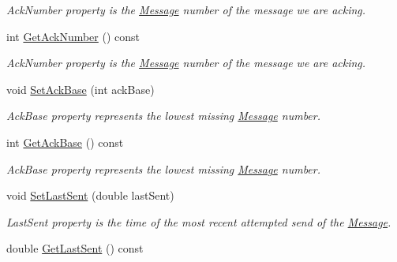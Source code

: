 \begin{DoxyCompactItemize}
\begin{DoxyCompactList}\small\item\em AckNumber property is the \hyperlink{classPseudoTcp_1_1Message}{Message} number of the message we are acking. \item\end{DoxyCompactList}\item 
\hypertarget{group__group1_ga5cb28e660d6cbed4a7bffbe6c2597cb9}{
int \hyperlink{group__group1_ga5cb28e660d6cbed4a7bffbe6c2597cb9}{GetAckNumber} () const }
\label{group__group1_ga5cb28e660d6cbed4a7bffbe6c2597cb9}

\begin{DoxyCompactList}\small\item\em AckNumber property is the \hyperlink{classPseudoTcp_1_1Message}{Message} number of the message we are acking. \item\end{DoxyCompactList}\item 
\hypertarget{group__group1_ga21fdfd49d1112874b860a10094f7dbe4}{
void \hyperlink{group__group1_ga21fdfd49d1112874b860a10094f7dbe4}{SetAckBase} (int ackBase)}
\label{group__group1_ga21fdfd49d1112874b860a10094f7dbe4}

\begin{DoxyCompactList}\small\item\em AckBase property represents the lowest missing \hyperlink{classPseudoTcp_1_1Message}{Message} number. \item\end{DoxyCompactList}\item 
\hypertarget{group__group1_ga18f1c004034b89226d9c29a16425e18f}{
int \hyperlink{group__group1_ga18f1c004034b89226d9c29a16425e18f}{GetAckBase} () const }
\label{group__group1_ga18f1c004034b89226d9c29a16425e18f}

\begin{DoxyCompactList}\small\item\em AckBase property represents the lowest missing \hyperlink{classPseudoTcp_1_1Message}{Message} number. \item\end{DoxyCompactList}\item 
void \hyperlink{group__group1_ga8d775b77bb73f7db77e0f8fec82b9a26}{SetLastSent} (double lastSent)
\begin{DoxyCompactList}\small\item\em LastSent property is the time of the most recent attempted send of the \hyperlink{classPseudoTcp_1_1Message}{Message}. \item\end{DoxyCompactList}\item 
\hypertarget{group__group1_ga342f652745ccf8d643991905c3c4ac0a}{
double \hyperlink{group__group1_ga342f652745ccf8d643991905c3c4ac0a}{GetLastSent} () const }
\label{group__group1_ga342f652745ccf8d643991905c3c4ac0a}


\end{DoxyCompactItemize}
